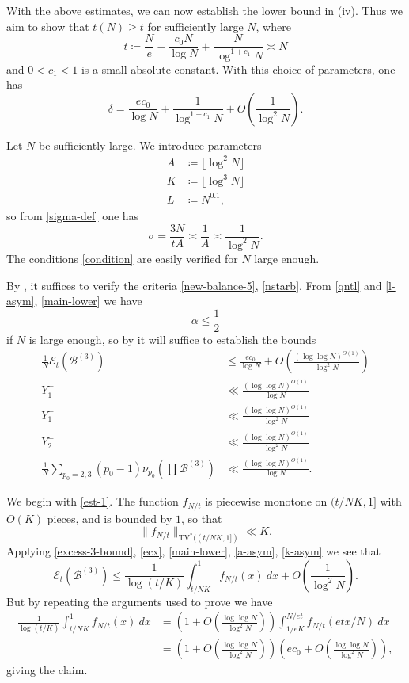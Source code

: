 \documentclass[12pt,a4paper,reqno]{amsart}
\numberwithin{equation}{section}
\theoremstyle{plain}
\theoremstyle{definition}
\newcommand\tuple{{\mathcal B}}
\newcommand\excess{{\mathcal{E}}}
\begin{document}
With the above estimates, we can now establish the lower bound in (iv).  Thus we aim to show that $t(N) \geq t$ for sufficiently large $N$, where
\begin{equation}\label{main-lower}
   t \coloneqq \frac{N}{e} - \frac{c_0 N}{\log N} + \frac{N}{\log^{1+c_1} N} \asymp N
\end{equation}
and $0 < c_1 < 1$ is a small absolute constant.  With this choice of parameters, one has
$$ \delta = \frac{ec_0}{\log N} + \frac{1}{\log^{1+c_1} N} + O\left( \frac{1}{\log^2 N} \right).$$

Let $N$ be sufficiently large.  We introduce parameters
\begin{align}
  A &\coloneqq \lfloor \log^2 N \rfloor\label{a-asym}\\
K &\coloneqq \lfloor \log^3 N \rfloor \label{k-asym} \\
L &\coloneqq N^{0.1},\label{l-asym}
\end{align}
so from \eqref{sigma-def} one has
$$ \sigma = \frac{3N}{tA} \asymp \frac{1}{A} \asymp \frac{1}{\log^2 N}.$$
The conditions \eqref{condition} are easily verified for $N$ large enough.

By , it suffices to verify the criteria 
\eqref{new-balance-5}, \eqref{nstarb}.  From \eqref{qntl} and \eqref{l-asym}, \eqref{main-lower} we have
$$ \alpha \leq \frac{1}{2}$$
if $N$ is large enough, so by  it will suffice to establish the bounds
\begin{align}
  \frac{1}{N} \excess_t(\tuple^{(3)}) &\leq
  \frac{ec_0}{\log N} + O\left( \frac{(\log\log N)^{O(1)}}{\log^2 N} \right) \label{est-1}\\
  Y_1^+ &\ll \frac{(\log\log N)^{O(1)}}{\log N} \label{y1p-est}\\
  Y_1^- &\ll \frac{(\log\log N)^{O(1)}}{\log^2 N}\label{y1m-est}\\
  Y_2^\pm &\ll \frac{(\log\log N)^{O(1)}}{\log^2 N}\label{y2pm-est} \\
\frac{1}{N} \sum_{p_0=2,3} (p_0-1) \nu_{p_0}\left(\prod \tuple^{(3)}\right) &\ll \frac{(\log\log N)^{O(1)}}{\log N}.\label{23-est}
\end{align}

We begin with \eqref{est-1}.  The function $f_{N/t}$ is piecewise monotone on $(t/NK,1]$ with $O(K)$ pieces, and is bounded by $1$, so that 
$$ \|f_{N/t}\|_{\mathrm{TV}^*((t/NK,1])} \ll K.$$
Applying \eqref{excess-3-bound}, \eqref{ecx}, \eqref{main-lower}, \eqref{a-asym}, \eqref{k-asym} we see that
$$ \excess_t(\tuple^{(3)}) \leq \frac{1}{\log(t/K)} \int_{t/NK}^1 f_{N/t}(x)\ dx + O\left( \frac{1}{\log^2 N} \right).$$
But by repeating the arguments used to prove  we have
\begin{align*}
\frac{1}{\log(t/K)} \int_{t/NK}^1 f_{N/t}(x)\ dx &= \left(1 + O\left( \frac{\log\log N}{\log^2 N} \right)\right) \int_{1/eK}^{N/et} f_{N/t}(etx/N)\ dx \\
&= \left(1 + O\left( \frac{\log\log N}{\log^2 N} \right)\right) \left(ec_0 + O\left( \frac{\log\log N}{\log^2 N} \right)\right),
\end{align*}
giving the claim.
\end{document}
